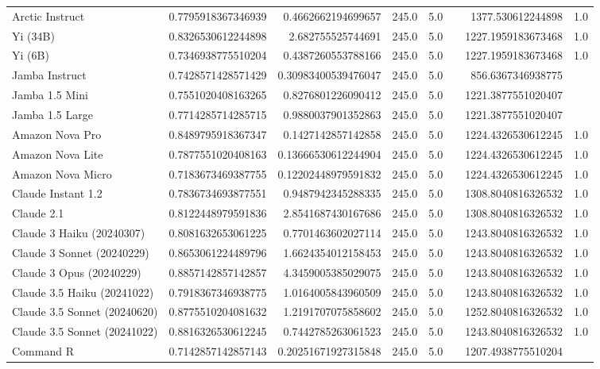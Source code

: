 \begin{table}[htp]
{\begin{tabular}{lrrrrrrr}
Arctic Instruct & 0.7795918367346939 & 0.4662662194699657 & 245.0 & 5.0 &  & 1377.530612244898 & 1.0 \\
Yi (34B) & 0.8326530612244898 & 2.682755525744691 & 245.0 & 5.0 &  & 1227.1959183673468 & 1.0 \\
Yi (6B) & 0.7346938775510204 & 0.4387260553788166 & 245.0 & 5.0 &  & 1227.1959183673468 & 1.0 \\
Jamba Instruct & 0.7428571428571429 & 0.30983400539476047 & 245.0 & 5.0 &  & 856.6367346938775 &  \\
Jamba 1.5 Mini & 0.7551020408163265 & 0.8276801226090412 & 245.0 & 5.0 &  & 1221.3877551020407 &  \\
Jamba 1.5 Large & 0.7714285714285715 & 0.9880037901352863 & 245.0 & 5.0 &  & 1221.3877551020407 &  \\
Amazon Nova Pro & 0.8489795918367347 & 0.1427142857142858 & 245.0 & 5.0 &  & 1224.4326530612245 & 1.0 \\
Amazon Nova Lite & 0.7877551020408163 & 0.13666530612244904 & 245.0 & 5.0 &  & 1224.4326530612245 & 1.0 \\
Amazon Nova Micro & 0.7183673469387755 & 0.12202448979591832 & 245.0 & 5.0 &  & 1224.4326530612245 & 1.0 \\
Claude Instant 1.2 & 0.7836734693877551 & 0.9487942345288335 & 245.0 & 5.0 &  & 1308.8040816326532 & 1.0 \\
Claude 2.1 & 0.8122448979591836 & 2.8541687430167686 & 245.0 & 5.0 &  & 1308.8040816326532 & 1.0 \\
Claude 3 Haiku (20240307) & 0.8081632653061225 & 0.7701463602027114 & 245.0 & 5.0 &  & 1243.8040816326532 & 1.0 \\
Claude 3 Sonnet (20240229) & 0.8653061224489796 & 1.6624354012158453 & 245.0 & 5.0 &  & 1243.8040816326532 & 1.0 \\
Claude 3 Opus (20240229) & 0.8857142857142857 & 4.3459005385029075 & 245.0 & 5.0 &  & 1243.8040816326532 & 1.0 \\
Claude 3.5 Haiku (20241022) & 0.7918367346938775 & 1.0164005843960509 & 245.0 & 5.0 &  & 1243.8040816326532 & 1.0 \\
Claude 3.5 Sonnet (20240620) & 0.8775510204081632 & 1.2191707075858602 & 245.0 & 5.0 &  & 1252.8040816326532 & 1.0 \\
Claude 3.5 Sonnet (20241022) & 0.8816326530612245 & 0.7442785263061523 & 245.0 & 5.0 &  & 1243.8040816326532 & 1.0 \\
Command R & 0.7142857142857143 & 0.20251671927315848 & 245.0 & 5.0 &  & 1207.4938775510204 &  \\

\end{tabular}}
\end{table}
